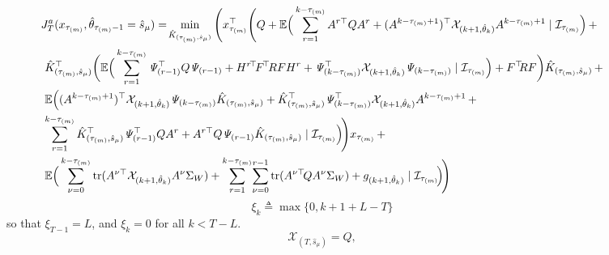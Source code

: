 \documentclass[journal,twoside,web]{ieeecolor}
\begin{document}
\begin{figure*}[ht]
\raggedright
\begin{align}\label{eq:cost-tau1}
\begin{aligned}
 & \text{\small $J_{T}^{a}(x_{\tau_{(m)}},\hat{\theta}_{\tau_{(m)}-1}=\hat{s}_{\mu}) = \!
    \min_{\hat{K}_{(\tau_{(m)},\hat{s}_{\mu})}} \Bigg( x_{\tau_{(m)}}^{\top} \Bigg(Q + \mathbb{E} \Big( \sum_{r=1}^{k-\tau_{(m)}} A^{r \top} Q A^{r}  + (A^{k-\tau_{(m)}+1})^{\top} \mathcal{X}_{(k+1,\hat{\theta}_k)} A^{k-\tau_{(m)}+1}\mid \mathcal{I}_{\tau_{(m)}} \Big) \,+ $}\\
    & ~ \text{\small $\hat{K}_{(\tau_{(m)},\hat{s}_{\mu})}^{\top} \bigg( \mathbb{E} \Big( \sum_{r=1}^{k-\tau_{(m)}} \mathit{\Psi}_{(r-1)}^{\top} Q \mathit{\Psi}_{(r-1)} + H^{r \!\top} \! F^{\!\top} \! R F H^{r} + \mathit{\Psi}_{(k-\tau_{(m)})}^{\top} \mathcal{X}_{(k+1,\hat{\theta}_k)} \mathit{\Psi}_{(k-\tau_{(m)})} \mid \mathcal{I}_{\tau_{(m)}} \Big) + F^{\top}\!\! R F \bigg) \hat{K}_{(\tau_{(m)},\hat{s}_{\mu})} \,+ $} \\
    & ~ \text{\small  $\mathbb{E} \Big( (A^{k-\tau_{(m)}+1})^{\top} \mathcal{X}_{(k+1,\hat{\theta}_k)} \mathit{\Psi}_{(k-\tau_{(m)})} \hat{K}_{(\tau_{(m)},\hat{s}_{\mu})} + \hat{K}_{(\tau_{(m)},\hat{s}_{\mu})}^{\top} \mathit{\Psi}_{(k-\tau_{(m)})} ^{\top} \mathcal{X}_{(k+1,\hat{\theta}_k)} A^{k-\tau_{(m)}+1} \,+$} \\
    & ~ \text{\small $ \sum_{r=1}^{k-\tau_{(m)}}\hat{K}_{(\tau_{(m)},\hat{s}_{\mu})}^{\top} \mathit{\Psi}_{(r-1)}^{\top} Q A^{r} +  A^{r \top} Q \mathit{\Psi}_{(r-1)} \hat{K}_{(\tau_{(m)},\hat{s}_{\mu})} 
    \mid \mathcal{I}_{\tau_{(m)}} \Big) \! \Bigg) x_{\tau_{(m)}} \,+$} \\
    & ~ \text{\small $\mathbb{E} \Big( \sum_{\nu=0}^{k-\tau_{(m)}} \mathop{\mathrm{tr}} (A^{\nu \top}  \mathcal{X}_{(k+1,\hat{\theta}_k)} A^{\nu} \Sigma_W) +\sum_{r=1}^{k-\tau_{(m)}} \!\sum_{\nu=0}^{r-1} \mathop{\mathrm{tr}} (A^{\nu \top} \! Q A^{\nu} \Sigma_W) + g_{(k+1,\hat{\theta}_k)} \mid \mathcal{I}_{\tau_{(m)}} \! \Big)\!\Bigg)$}
\end{aligned}
\end{align}
\begin{equation}\label{eq:xik}
    \xi_k \triangleq \max \{0, k+1+L-T \}
\end{equation}
so that $\xi_{T-1}=L$, and $\xi_{k} = 0$ for all $k<T-L$.
\begin{equation}\label{eq:fh-x-t}
    \mathcal{X}_{(T,\hat{s}_{\mu})} = Q,    
\end{equation}
\begin{equation}\label{eq:fh-g-t}

\end{equation}
\end{figure*}
\end{document}

